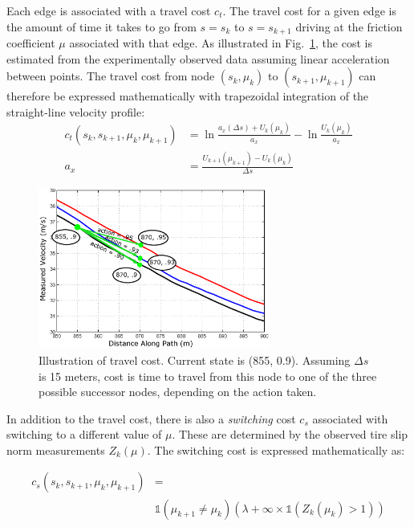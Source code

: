 \documentclass[9pt,shortpaper,twoside,web]{ieeecolor}
\begin{document}
 
Each edge is associated with a travel cost $c_t$. The travel cost for a given edge is the amount of time it takes to go from
$s = s_k$ to $s = s_{k+1}$ driving at the friction coefficient $\mu$ associated with that edge. As illustrated in Fig.~\ref{fig:costDiag}, the cost is estimated from the experimentally
observed data assuming linear acceleration between points. The travel cost from node $(s_k, \mu_k)$ to $(s_{k+1}, \mu_{k+1})$ can therefore be expressed mathematically with trapezoidal integration of the straight-line velocity profile:
\begin{align}
c_t(s_k, s_{k+1},\mu_k, \mu_{k+1}) &= \ln \frac{a_x(\Delta s) + U_k(\mu_k)}{a_x} - \ln \frac{U_k(\mu_k)}{a_x} \\
a_x &= \frac{U_{k+1}(\mu_{k+1}) - U_k(\mu_k)}{\Delta s}
\end{align}

 \begin{figure}[tb]
\centering
\includegraphics[width=3in]{figures/costStructure.eps}
\caption[Illustration of travel cost.]{Illustration of travel cost. Current state is (855, 0.9). Assuming $\Delta s$ is 15 meters, cost is time to travel from this node
to one of the three possible successor nodes, depending on the action taken.}
\label{fig:costDiag}
\end{figure} 

In addition to the travel cost, there is also a \textit{switching} cost $c_s$ associated with switching to a different value of $\mu$. These
are determined by the observed tire slip norm measurements $Z_k(\mu)$. The switching cost is expressed mathematically as:

\begin{align}
\label{eq:swCost}
c_s(s_k, s_{k+1},\mu_k, \mu_{k+1}) &= \\
&\mathds{1}\left(\mu_{k+1} \neq \mu_{k}\right)\left(\lambda  + \infty \times\mathds{1}\left(Z_k(\mu_k) > 1\right) \nonumber \right)
\end{align}
\end{document}
